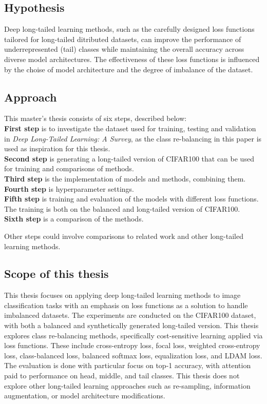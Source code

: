 \subsection{Hypothesis}
Deep long-tailed learning methods, such as the carefully designed loss functions tailored for long-tailed ditributed datasets, can improve the performance of underrepresented (tail) classes while maintaining the overall accuracy across diverse model architectures. The effectiveness of these loss functions is influenced by the choise of model architecture and the degree of imbalance of the dataset.


\subsection{Approach}
This master's thesis consists of six steps, described below:\\  

\textbf{First step} is to investigate the dataset used for training, testing and validation in \textit{Deep Long-Tailed Learning: A Survey}, as the class re-balancing in this paper is used as inspiration for this thesis.\\

\textbf{Second step} is generating a long-tailed version of CIFAR100 that can be used for training and comparisons of methods.\\

\textbf{Third step} is the implementation of models and methods, combining them.\\

\textbf{Fourth step} is hyperparameter settings.\\

\textbf{Fifth step} is training and evaluation of the models with different loss functions. The training is both on the balanced and long-tailed version of CIFAR100.\\

\textbf{Sixth step} is a comparison of the methods.

Other steps could involve comparisons to related work and other long-tailed learning methods.

\subsection{Scope of this thesis}
This thesis focuses on applying deep long-tailed learning methods to image classification tasks with an emphasis on loss functions as a solution to handle imbalanced datasets. The experiments are conducted on the CIFAR100 dataset, with both a balanced and synthetically generated long-tailed version. This thesis explores class re-balancing methods, specifically cost-sensitive learning applied via loss functions. These include cross-entropy loss, focal loss, weighted cross-entropy loss,  class-balanced loss, balanced softmax loss, equalization loss, and LDAM loss. The evaluation is done with particular focus on top-1 accuracy, with attention paid to performance on head, middle, and tail classes. This thesis does not explore other long-tailed learning approaches such as re-sampling, information augmentation, or model architecture modifications.

